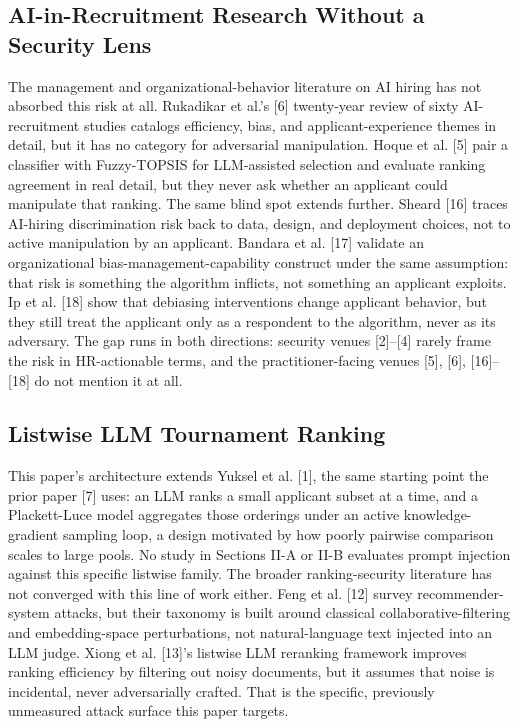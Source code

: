 \documentclass[journal]{IEEEtran}
\begin{document}
\subsection{AI-in-Recruitment Research Without a Security Lens}
The management and organizational-behavior literature on AI hiring has not absorbed this risk at all. Rukadikar et al.'s [6] twenty-year review of sixty AI-recruitment studies catalogs efficiency, bias, and applicant-experience themes in detail, but it has no category for adversarial manipulation. Hoque et al. [5] pair a classifier with Fuzzy-TOPSIS for LLM-assisted selection and evaluate ranking agreement in real detail, but they never ask whether an applicant could manipulate that ranking. The same blind spot extends further. Sheard [16] traces AI-hiring discrimination risk back to data, design, and deployment choices, not to active manipulation by an applicant. Bandara et al. [17] validate an organizational bias-management-capability construct under the same assumption: that risk is something the algorithm inflicts, not something an applicant exploits. Ip et al. [18] show that debiasing interventions change applicant behavior, but they still treat the applicant only as a respondent to the algorithm, never as its adversary. The gap runs in both directions: security venues [2]--[4] rarely frame the risk in HR-actionable terms, and the practitioner-facing venues [5], [6], [16]--[18] do not mention it at all.

\subsection{Listwise LLM Tournament Ranking}
This paper's architecture extends Yuksel et al. [1], the same starting point the prior paper [7] uses: an LLM ranks a small applicant subset at a time, and a Plackett-Luce model aggregates those orderings under an active knowledge-gradient sampling loop, a design motivated by how poorly pairwise comparison scales to large pools. No study in Sections II-A or II-B evaluates prompt injection against this specific listwise family. The broader ranking-security literature has not converged with this line of work either. Feng et al. [12] survey recommender-system attacks, but their taxonomy is built around classical collaborative-filtering and embedding-space perturbations, not natural-language text injected into an LLM judge. Xiong et al. [13]'s listwise LLM reranking framework improves ranking efficiency by filtering out noisy documents, but it assumes that noise is incidental, never adversarially crafted. That is the specific, previously unmeasured attack surface this paper targets.
\end{document}
